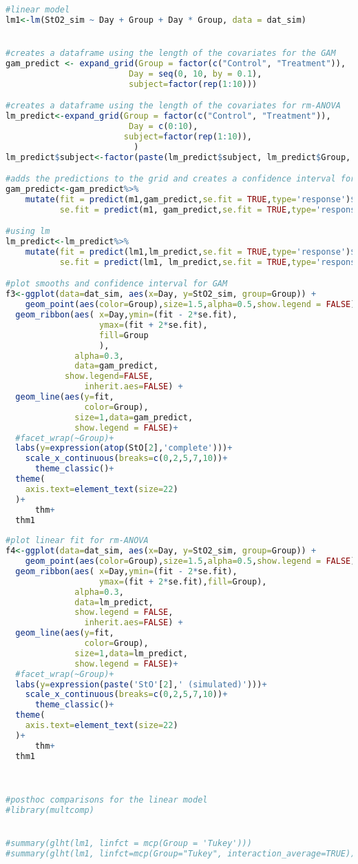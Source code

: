 \documentclass[
]{article}
\begin{document}
\begin{lstlisting}[language=R]
#linear model
lm1<-lm(StO2_sim ~ Day + Group + Day * Group, data = dat_sim)


#creates a dataframe using the length of the covariates for the GAM
gam_predict <- expand_grid(Group = factor(c("Control", "Treatment")),
                         Day = seq(0, 10, by = 0.1),
                         subject=factor(rep(1:10)))

#creates a dataframe using the length of the covariates for rm-ANOVA
lm_predict<-expand_grid(Group = factor(c("Control", "Treatment")),
                         Day = c(0:10),
                        subject=factor(rep(1:10)),
                          )
lm_predict$subject<-factor(paste(lm_predict$subject, lm_predict$Group, sep = "-"))

#adds the predictions to the grid and creates a confidence interval for GAM
gam_predict<-gam_predict%>%
    mutate(fit = predict(m1,gam_predict,se.fit = TRUE,type='response')$fit,
           se.fit = predict(m1, gam_predict,se.fit = TRUE,type='response')$se.fit)

#using lm
lm_predict<-lm_predict%>%
    mutate(fit = predict(lm1,lm_predict,se.fit = TRUE,type='response')$fit,
           se.fit = predict(lm1, lm_predict,se.fit = TRUE,type='response')$se.fit)

#plot smooths and confidence interval for GAM
f3<-ggplot(data=dat_sim, aes(x=Day, y=StO2_sim, group=Group)) +
    geom_point(aes(color=Group),size=1.5,alpha=0.5,show.legend = FALSE)+
  geom_ribbon(aes( x=Day,ymin=(fit - 2*se.fit), 
                   ymax=(fit + 2*se.fit),
                   fill=Group
                   ),
              alpha=0.3,
              data=gam_predict,
            show.legend=FALSE,
                inherit.aes=FALSE) +
  geom_line(aes(y=fit,
                color=Group),
              size=1,data=gam_predict,
              show.legend = FALSE)+
  #facet_wrap(~Group)+
  labs(y=expression(atop(StO[2],'complete')))+
    scale_x_continuous(breaks=c(0,2,5,7,10))+
      theme_classic()+
  theme(
    axis.text=element_text(size=22)
  )+
      thm+
  thm1
 
#plot linear fit for rm-ANOVA
f4<-ggplot(data=dat_sim, aes(x=Day, y=StO2_sim, group=Group)) +
    geom_point(aes(color=Group),size=1.5,alpha=0.5,show.legend = FALSE)+
  geom_ribbon(aes( x=Day,ymin=(fit - 2*se.fit), 
                   ymax=(fit + 2*se.fit),fill=Group),
              alpha=0.3,
              data=lm_predict,
              show.legend = FALSE,
                inherit.aes=FALSE) +
  geom_line(aes(y=fit,
                color=Group),
              size=1,data=lm_predict,
              show.legend = FALSE)+
  #facet_wrap(~Group)+
  labs(y=expression(paste('StO'[2],' (simulated)')))+
    scale_x_continuous(breaks=c(0,2,5,7,10))+
      theme_classic()+
  theme(
    axis.text=element_text(size=22)
  )+
      thm+
  thm1
 


#posthoc comparisons for the linear model
#library(multcomp)


#summary(glht(lm1, linfct = mcp(Group = 'Tukey')))
#summary(glht(lm1, linfct=mcp(Group="Tukey", interaction_average=TRUE)))
\end{lstlisting}
\end{document}
